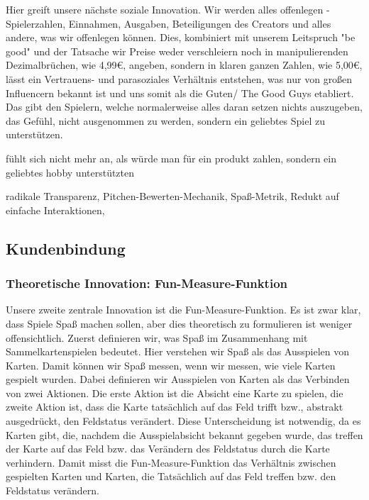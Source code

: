 \documentclass[fontsize=12]{scrartcl}
\begin{document}
	\noindent Hier greift unsere nächste soziale Innovation. Wir werden alles offenlegen - Spielerzahlen, Einnahmen, Ausgaben, Beteiligungen des Creators und alles andere, was wir offenlegen können. Dies, kombiniert mit unserem Leitspruch "be good" und der Tatsache wir Preise weder verschleiern noch in manipulierenden Dezimalbrüchen, wie 4,99€, angeben, sondern in klaren ganzen Zahlen, wie 5,00€, lässt ein Vertrauens- und parasoziales Verhältnis entstehen, was nur von großen Influencern bekannt ist und uns somit als die Guten/ \glqq The Good Guys \grqq etabliert. Das gibt den Spielern, welche normalerweise alles daran setzen nichts auszugeben, das Gefühl, nicht ausgenommen zu werden, sondern ein geliebtes Spiel zu unterstützen.
	
	fühlt sich nicht mehr an, als würde man für ein produkt zahlen, sondern ein geliebtes hobby unterstützten
	
	radikale Transparenz, Pitchen-Bewerten-Mechanik, Spaß-Metrik, Redukt auf einfache Interaktionen, 
	
	\subsection{Kundenbindung}
	
	\subsubsection{Theoretische Innovation: Fun-Measure-Funktion}
	
	Unsere zweite zentrale Innovation ist die Fun-Measure-Funktion. Es ist zwar klar, dass Spiele Spaß machen sollen, aber dies theoretisch zu formulieren ist weniger offensichtlich. Zuerst definieren wir, was \glqq Spaß \grqq im Zusammenhang mit Sammelkartenspielen bedeutet. Hier verstehen wir \glqq Spaß \grqq als das \glqq Ausspielen \grqq von Karten. Damit können wir Spaß messen, wenn wir messen, wie viele Karten gespielt wurden. Dabei definieren wir \glqq Ausspielen \grqq von Karten als das Verbinden von zwei Aktionen. Die erste Aktion ist die Absicht eine Karte zu spielen, die zweite Aktion ist, dass die Karte tatsächlich auf das Feld trifft bzw., abstrakt ausgedrückt, den Feldstatus verändert. Diese Unterscheidung ist notwendig, da es Karten gibt, die, nachdem die Ausspielabsicht bekannt gegeben wurde, das treffen der Karte auf das Feld bzw. das Verändern des Feldstatus durch die Karte verhindern. Damit misst die Fun-Measure-Funktion das Verhältnis zwischen gespielten Karten und Karten, die Tatsächlich auf das Feld treffen bzw. den Feldstatus verändern.\hfill\newline
	
\end{document}
